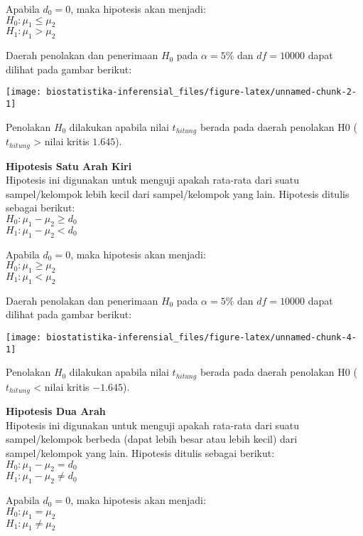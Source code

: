 \documentclass[
]{book}
\begin{document}
Apabila \(d_0 = 0\), maka hipotesis akan menjadi:\\
\(H_0 : \mu_1 \leq \mu_2\)\\
\(H_1 : \mu_1 > \mu_2\)

Daerah penolakan dan penerimaan \(H_0\) pada \(\alpha = 5\%\) dan \(df = 10000\) dapat dilihat pada gambar berikut:

\begin{center}\texttt{[image: biostatistika-inferensial\_files/figure-latex/unnamed-chunk-2-1]} \end{center}

Penolakan \(H_0\) dilakukan apabila nilai \(t_{hitung}\) berada pada daerah penolakan H0 (\(t_{hitung}\) \textgreater{} nilai kritis \(1.645\)).

\textbf{Hipotesis Satu Arah Kiri}\\
Hipotesis ini digunakan untuk menguji apakah rata-rata dari suatu sampel/kelompok lebih kecil dari sampel/kelompok yang lain. Hipotesis ditulis sebagai berikut:\\
\(H_0 : \mu_1-\mu_2 \geq d_0\)\\
\(H_1 : \mu_1-\mu_2 < d_0\)

Apabila \(d_0 = 0\), maka hipotesis akan menjadi:\\
\(H_0 : \mu_1 \geq \mu_2\)\\
\(H_1 : \mu_1 < \mu_2\)

Daerah penolakan dan penerimaan \(H_0\) pada \(\alpha = 5\%\) dan \(df = 10000\) dapat dilihat pada gambar berikut:

\begin{center}\texttt{[image: biostatistika-inferensial\_files/figure-latex/unnamed-chunk-4-1]} \end{center}

Penolakan \(H_0\) dilakukan apabila nilai \(t_{hitung}\) berada pada daerah penolakan H0 (\(t_{hitung}\) \textless{} nilai kritis \(-1.645\)).

\textbf{Hipotesis Dua Arah}\\
Hipotesis ini digunakan untuk menguji apakah rata-rata dari suatu sampel/kelompok berbeda (dapat lebih besar atau lebih kecil) dari sampel/kelompok yang lain. Hipotesis ditulis sebagai berikut:\\
\(H_0 : \mu_1-\mu_2 = d_0\)\\
\(H_1 : \mu_1-\mu_2 \neq d_0\)

Apabila \(d_0 = 0\), maka hipotesis akan menjadi:\\
\(H_0 : \mu_1 = \mu_2\)\\
\(H_1 : \mu_1 \neq \mu_2\)
\end{document}
